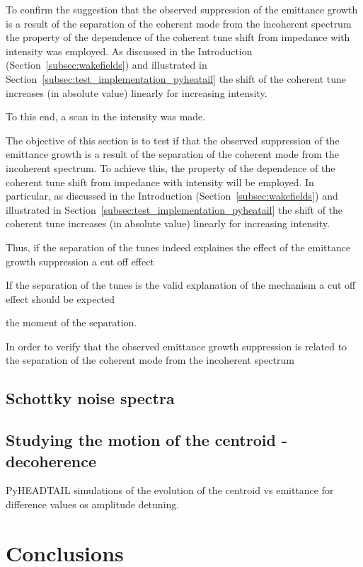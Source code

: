 To confirm the suggestion that the observed suppression of the emittance growth is a result of the separation of the coherent mode from the incoherent spectrum the property of the dependence of the coherent tune shift from impedance with intensity was employed. As discussed in the Introduction (Section~\ref{subsec:wakefields}) and illustrated in Section~\ref{subsec:test_implementation_pyheatail} the shift of the coherent tune increases (in absolute value) linearly for increasing intensity. 


To this end, a scan in the intensity was made.




The objective of this section is to test if that the observed suppression of the emittance growth is a result of the separation of the coherent mode from the incoherent spectrum. To achieve this, the property of the dependence of the coherent tune shift from impedance with intensity will be employed. In particular, as discussed in the Introduction (Section~\ref{subsec:wakefields}) and illustrated in Section~\ref{subsec:test_implementation_pyheatail} the shift of the coherent tune increases (in absolute value) linearly for increasing intensity. 



Thus, if the separation of the tunes indeed explaines the effect of the emittance growth suppression a cut off effect


If the separation of the tunes is the valid explanation of the mechanism a cut off effect should be expected 


the moment of the separation. 



In order to verify that the observed emittance growth suppression is related to the separation of the coherent mode from the incoherent spectrum


\subsection{Schottky noise spectra}
\subsection{Studying the motion of the centroid - decoherence}
PyHEADTAIL simulations of the evolution of the centroid vs emittance for difference values os amplitude detuning. 



\section{Conclusions}


